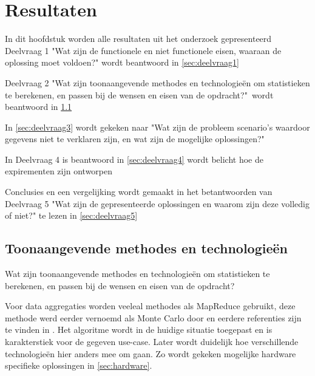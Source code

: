 \chapter{Resultaten}

In dit hoofdstuk worden alle resultaten uit het onderzoek gepresenteerd
Deelvraag 1 "Wat zijn de functionele en niet functionele eisen, waaraan de oplossing moet voldoen?" wordt beantwoord in \ref{sec:deelvraag1}

Deelvraag 2 "Wat zijn toonaangevende methodes en technologieën om statistieken te berekenen, en passen bij de wensen en eisen van de opdracht?"\  wordt beantwoord in \ref{sec:deelvraag2}

In \ref{sec:deelvraag3} wordt gekeken naar "Wat zijn de probleem scenario's waardoor gegevens niet te verklaren zijn, en wat zijn de mogelijke oplossingen?"\

In Deelvraag 4 is beantwoord in \ref{sec:deelvraag4} wordt belicht hoe de expirementen zijn ontworpen

Conclusies en een vergelijking wordt gemaakt in het betantwoorden van Deelvraag 5 "Wat zijn de gepresenteerde oplossingen en waarom zijn deze volledig of niet?" te lezen in \ref{sec:deelvraag5}


\clearpage



\clearpage

\section{Toonaangevende methodes en technologieën}
\label{sec:deelvraag2}

Wat zijn toonaangevende methodes en technologieën om statistieken te berekenen, en passen bij de wensen en eisen van de opdracht?

Voor data aggregaties worden veeleal methodes als MapReduce gebruikt, deze methode werd eerder vernoemd als Monte Carlo door \textcite{asanovic2006landscape} en eerdere referenties zijn te vinden in \textcite{lee2010debunking}. Het algoritme wordt in de huidige situatie toegepast en is karakterstiek voor de gegeven use-case. Later wordt duidelijk hoe verschillende technologieën hier anders mee om gaan. Zo wordt gekeken mogelijke hardware specifieke oplossingen in \ref{sec:hardware}.


